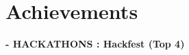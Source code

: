 \documentclass[letterpaper,11pt]{article}
\begin{document}
\section{Achievements}
 \begin{itemize}[leftmargin=0.15in, label={}]
    \small{\item{
     \textbf{- HACKATHONS : Hackfest (Top 4)  }\\
     
    }}
 \end{itemize}
%
\end{document}
